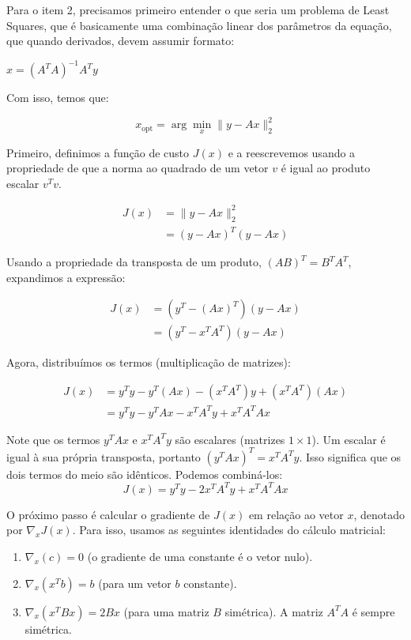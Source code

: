 Para o item 2, precisamos primeiro entender o que seria um problema de Least Squares, que é basicamente uma combinação linear dos parâmetros da equação, que quando derivados, devem assumir formato: 

$x = (A^T A)^{-1} A^T y$

Com isso, temos que:

$$
x_{\text{opt}} = \arg \min_{x} \| y - Ax \|_2^2
$$

Primeiro, definimos a função de custo $J(x)$ e a reescrevemos usando a propriedade de que a norma ao quadrado de um vetor $v$ é igual ao produto escalar $v^T v$.

\begin{align*}
	J(x) &= \| y - Ax \|_2^2 \\
	&= (y - Ax)^T (y - Ax)
\end{align*}

Usando a propriedade da transposta de um produto, $(AB)^T = B^T A^T$, expandimos a expressão:

\begin{align*}
	J(x) &= (y^T - (Ax)^T) (y - Ax) \\
	&= (y^T - x^T A^T) (y - Ax)
\end{align*}

Agora, distribuímos os termos (multiplicação de matrizes):

\begin{align*}
	J(x) &= y^T y - y^T(Ax) - (x^T A^T)y + (x^T A^T)(Ax) \\
	&= y^T y - y^T Ax - x^T A^T y + x^T A^T Ax
\end{align*}

Note que os termos $y^T Ax$ e $x^T A^T y$ são escalares (matrizes $1 \times 1$). Um escalar é igual à sua própria transposta, portanto $(y^T Ax)^T = x^T A^T y$. Isso significa que os dois termos do meio são idênticos. Podemos combiná-los:
$$
J(x) = y^T y - 2x^T A^T y + x^T A^T Ax
$$

O próximo passo é calcular o gradiente de $J(x)$ em relação ao vetor $x$, denotado por $\nabla_x J(x)$. Para isso, usamos as seguintes identidades do cálculo matricial:
\begin{enumerate}
	\item $\nabla_x (c) = 0$ (o gradiente de uma constante é o vetor nulo).
	\item $\nabla_x (x^T b) = b$ (para um vetor $b$ constante).
	\item $\nabla_x (x^T B x) = 2Bx$ (para uma matriz $B$ simétrica). A matriz $A^T A$ é sempre simétrica.
\end{enumerate}

